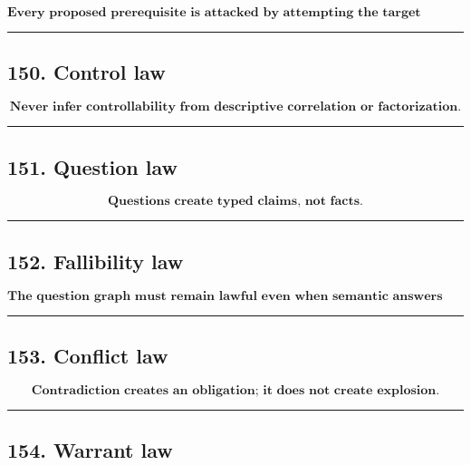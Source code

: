 \documentclass[
]{article}
\begin{document}
\[
\boxed{
\textbf{Every proposed prerequisite is attacked by attempting the target without it.}
}
\]

\begin{center}\rule{0.5\linewidth}{0.5pt}\end{center}

\subsection{150. Control law}\label{control-law}

\[
\boxed{
\textbf{Never infer controllability from descriptive correlation or factorization.}
}
\]

\begin{center}\rule{0.5\linewidth}{0.5pt}\end{center}

\subsection{151. Question law}\label{question-law}

\[
\boxed{
\textbf{Questions create typed claims, not facts.}
}
\]

\begin{center}\rule{0.5\linewidth}{0.5pt}\end{center}

\subsection{152. Fallibility law}\label{fallibility-law}

\[
\boxed{
\textbf{The question graph must remain lawful even when semantic answers are wrong.}
}
\]

\begin{center}\rule{0.5\linewidth}{0.5pt}\end{center}

\subsection{153. Conflict law}\label{conflict-law}

\[
\boxed{
\textbf{Contradiction creates an obligation; it does not create explosion.}
}
\]

\begin{center}\rule{0.5\linewidth}{0.5pt}\end{center}

\subsection{154. Warrant law}\label{warrant-law}
\end{document}
